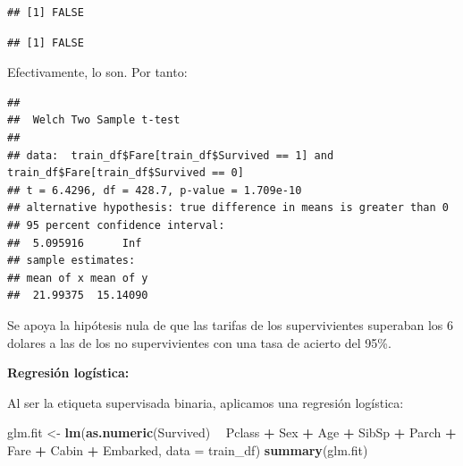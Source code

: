 \documentclass[]{article}
\newenvironment{Shaded}{\begin{snugshade}}{\end{snugshade}}
\newcommand{\DataTypeTok}[1]{\textcolor[rgb]{0.13,0.29,0.53}{#1}}
\newcommand{\DecValTok}[1]{\textcolor[rgb]{0.00,0.00,0.81}{#1}}
\newcommand{\FloatTok}[1]{\textcolor[rgb]{0.00,0.00,0.81}{#1}}
\newcommand{\KeywordTok}[1]{\textcolor[rgb]{0.13,0.29,0.53}{\textbf{#1}}}
\newcommand{\NormalTok}[1]{#1}
\newcommand{\OperatorTok}[1]{\textcolor[rgb]{0.81,0.36,0.00}{\textbf{#1}}}
\newcommand{\OtherTok}[1]{\textcolor[rgb]{0.56,0.35,0.01}{#1}}
\newcommand{\StringTok}[1]{\textcolor[rgb]{0.31,0.60,0.02}{#1}}
\begin{document}
\begin{verbatim}
## [1] FALSE
\end{verbatim}

\begin{Shaded}
\end{Shaded}

\begin{verbatim}
## [1] FALSE
\end{verbatim}

Efectivamente, lo son. Por tanto:

\begin{Shaded}
\end{Shaded}

\begin{verbatim}
## 
##  Welch Two Sample t-test
## 
## data:  train_df$Fare[train_df$Survived == 1] and train_df$Fare[train_df$Survived == 0]
## t = 6.4296, df = 428.7, p-value = 1.709e-10
## alternative hypothesis: true difference in means is greater than 0
## 95 percent confidence interval:
##  5.095916      Inf
## sample estimates:
## mean of x mean of y 
##  21.99375  15.14090
\end{verbatim}

Se apoya la hipótesis nula de que las tarifas de los supervivientes
superaban los 6 dolares a las de los no supervivientes con una tasa de
acierto del 95\%.

\textbf{Regresión logística:}

Al ser la etiqueta supervisada binaria, aplicamos una regresión
logística:

\begin{Shaded}
\begin{Highlighting}[]
\NormalTok{glm.fit <-}\StringTok{ }\KeywordTok{lm}\NormalTok{(}\KeywordTok{as.numeric}\NormalTok{(Survived) }\OperatorTok{~}\StringTok{ }\NormalTok{Pclass }\OperatorTok{+}\StringTok{ }\NormalTok{Sex }\OperatorTok{+}\StringTok{ }\NormalTok{Age }\OperatorTok{+}\StringTok{ }\NormalTok{SibSp }\OperatorTok{+}\StringTok{ }\NormalTok{Parch }\OperatorTok{+}\StringTok{ }\NormalTok{Fare }\OperatorTok{+}\StringTok{ }\NormalTok{Cabin }\OperatorTok{+}\StringTok{ }\NormalTok{Embarked, }\DataTypeTok{data =}\NormalTok{ train_df)}
\KeywordTok{summary}\NormalTok{(glm.fit)}
\end{Highlighting}
\end{Shaded}
\end{document}
